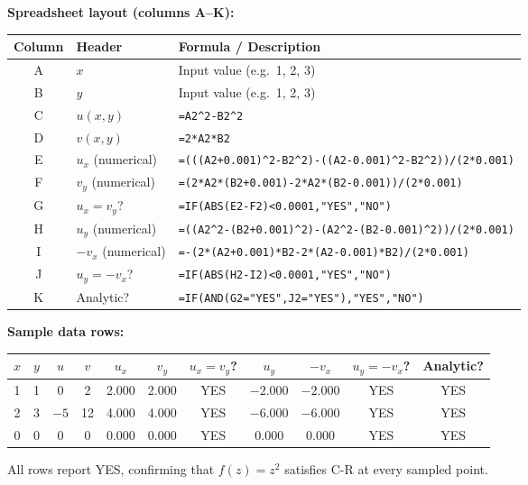\documentclass[12pt,a4paper]{article}
\begin{document}
\textbf{Spreadsheet layout (columns A--K):}

\begin{center}
\begin{tabular}{cll}
\toprule
\textbf{Column} & \textbf{Header} & \textbf{Formula / Description} \\
\midrule
A & $x$ & Input value (e.g.\ 1, 2, 3) \\
B & $y$ & Input value (e.g.\ 1, 2, 3) \\
C & $u(x,y)$ & \texttt{=A2\^{}2-B2\^{}2} \\
D & $v(x,y)$ & \texttt{=2*A2*B2} \\
E & $u_x$ (numerical) & \texttt{=(((A2+0.001)\^{}2-B2\^{}2)-((A2-0.001)\^{}2-B2\^{}2))/(2*0.001)} \\
F & $v_y$ (numerical) & \texttt{=(2*A2*(B2+0.001)-2*A2*(B2-0.001))/(2*0.001)} \\
G & $u_x = v_y$? & \texttt{=IF(ABS(E2-F2)<0.0001,"YES","NO")} \\
H & $u_y$ (numerical) & \texttt{=((A2\^{}2-(B2+0.001)\^{}2)-(A2\^{}2-(B2-0.001)\^{}2))/(2*0.001)} \\
I & $-v_x$ (numerical) & \texttt{=-(2*(A2+0.001)*B2-2*(A2-0.001)*B2)/(2*0.001)} \\
J & $u_y = -v_x$? & \texttt{=IF(ABS(H2-I2)<0.0001,"YES","NO")} \\
K & Analytic? & \texttt{=IF(AND(G2="YES",J2="YES"),"YES","NO")} \\
\bottomrule
\end{tabular}
\end{center}

\textbf{Sample data rows:}

\begin{center}
\begin{tabular}{ccccccccccc}
\toprule
$x$ & $y$ & $u$ & $v$ & $u_x$ & $v_y$ & $u_x{=}v_y$? & $u_y$ & $-v_x$ & $u_y{=}{-}v_x$? & Analytic? \\
\midrule
1 & 1 & 0 & 2 & 2.000 & 2.000 & YES & $-2.000$ & $-2.000$ & YES & YES \\
2 & 3 & $-5$ & 12 & 4.000 & 4.000 & YES & $-6.000$ & $-6.000$ & YES & YES \\
0 & 0 & 0 & 0 & 0.000 & 0.000 & YES & 0.000 & 0.000 & YES & YES \\
\bottomrule
\end{tabular}
\end{center}

All rows report YES, confirming that $f(z) = z^{2}$ satisfies C-R at every sampled point.
\end{document}

